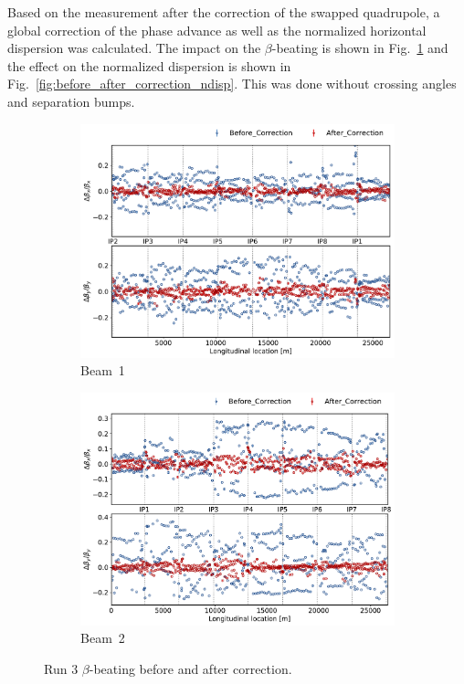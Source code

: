 \documentclass[a4paper]{cernatsnote}
\begin{document}
Based on the measurement after the correction of the swapped quadrupole, a global correction of the phase advance as well as the normalized horizontal dispersion was calculated. The impact on the $\beta$-beating is shown in Fig.~\ref{fig:before_after_correction_beta_beat} and the effect on the normalized dispersion is shown in Fig.~\ref{fig:before_after_correction_ndisp}. This was done without crossing angles and separation bumps. 

\begin{figure}[ht]
\begin{subfigure}{.5\textwidth}
  \centering
  \includegraphics[width=.99\linewidth]{plots/beam1/beta_beat_before_and_after_corr.pdf}  
  \caption{Beam~1}
\end{subfigure}
\begin{subfigure}{.5\textwidth}
  \centering
  \includegraphics[width=.99\linewidth]{plots/beam2/beta_beat_before_after_correction.pdf}  
  \caption{Beam~2}
\end{subfigure}
\caption{Run 3 $\beta$-beating before and after correction.}
\label{fig:before_after_correction_beta_beat}
\end{figure}
\end{document}
